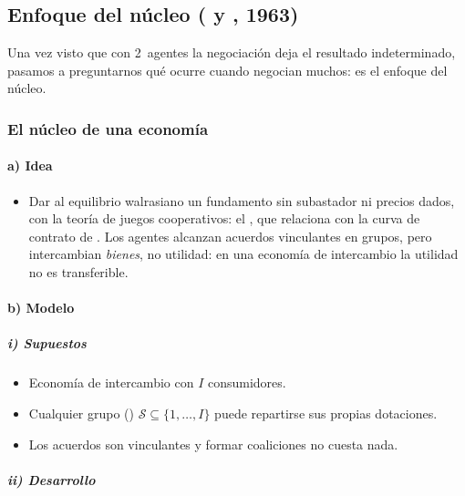 \documentclass[11pt]{article}
\begin{document}
\subsection{Enfoque del núcleo ( y , 1963)}\label{sec:enfoque-nucleo-debreu}

Una vez visto que con 2~agentes la negociación deja el resultado indeterminado, pasamos a preguntarnos qué ocurre cuando negocian muchos: es el enfoque del núcleo.

\subsubsection{El núcleo de una economía}\label{sec:nucleo-economia}

\paragraph{a) Idea}

\begin{itemize}
\item Dar al equilibrio walrasiano un fundamento sin subastador ni precios dados, con la teoría de juegos cooperativos: el \nocite{Gillies1959Solutions}, que \textcite{Shubik1959Edgeworth} relaciona con la curva de contrato de  . Los agentes alcanzan acuerdos vinculantes en grupos, pero intercambian \emph{bienes}, no utilidad: en una economía de intercambio la utilidad no es transferible.
\end{itemize}

\paragraph{b) Modelo}

\subparagraph{i) Supuestos}

\begin{itemize}
\item Economía de intercambio con $I$ consumidores.
\item Cualquier grupo () $\mathcal{S}\subseteq\{1,\dots,I\}$ puede repartirse sus propias dotaciones.
\item Los acuerdos son vinculantes y formar coaliciones no cuesta nada.
\end{itemize}

\subparagraph{ii) Desarrollo}
\end{document}
